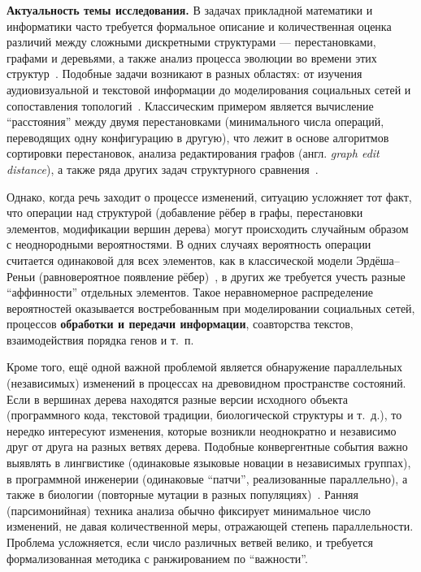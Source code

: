 

\textbf{Актуальность темы исследования.}  
В задачах прикладной математики и информатики часто требуется формальное описание и количественная оценка различий между сложными дискретными структурами --- перестановками, графами и деревьями, а также анализ процесса эволюции во времени этих структур~\cite{Penny2004,Bunke1997}.  
Подобные задачи возникают в разных областях: от изучения аудиовизуальной и текстовой информации до моделирования социальных сетей и сопоставления топологий~\cite{baret2004phylogenetic,McCollum2023,Piar2020,Newman2003}.  
Классическим примером является вычисление ``расстояния'' между двумя перестановками (минимального числа операций, переводящих одну конфигурацию в другую), что лежит в основе алгоритмов сортировки перестановок, анализа редактирования графов (англ. \textit{graph edit distance}), а также ряда других задач структурного сравнения~\cite{Pevzner03}.  

Однако, когда речь заходит о процессе изменений, ситуацию усложняет тот факт, что операции над структурой (добавление рёбер в графы, перестановки элементов, модификации вершин дерева) могут происходить случайным образом с неоднородными вероятностями.  
В одних случаях вероятность операции считается одинаковой для всех элементов, как в классической модели \mbox{Эрдёша--Реньи} (равновероятное появление рёбер)~\cite{Erdos1959}, в других же требуется учесть разные ``аффинности'' отдельных элементов.  
Такое неравномерное распределение вероятностей оказывается востребованным при моделировании социальных сетей, процессов \textbf{обработки и передачи информации}, соавторства текстов, взаимодействия порядка генов и т.~п.  

Кроме того, ещё одной важной проблемой является обнаружение параллельных (независимых) изменений в процессах на древовидном пространстве состояний.  
Если в вершинах дерева находятся разные версии исходного объекта (программного кода, текстовой традиции, биологической структуры и т.~д.), то нередко интересуют изменения, которые возникли неоднократно и независимо друг от друга на разных ветвях дерева.  
Подобные конвергентные события важно выявлять в лингвистике (одинаковые языковые новации в независимых группах), в программной инженерии (одинаковые ``патчи'', реализованные параллельно), а также в биологии (повторные мутации в разных популяциях)~\cite{Rokas2008}.  
Ранняя (парсимонийная) техника анализа обычно фиксирует минимальное число изменений, не давая количественной меры, отражающей степень параллельности.  
Проблема усложняется, если число различных ветвей велико, и требуется формализованная методика с ранжированием по ``важности''. 

